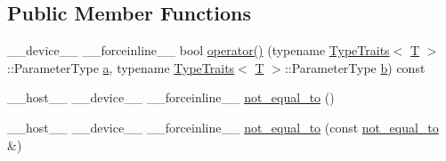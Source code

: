 \subsection*{Public Member Functions}
\begin{DoxyCompactItemize}
\item 
\-\_\-\-\_\-device\-\_\-\-\_\- \-\_\-\-\_\-forceinline\-\_\-\-\_\- bool \hyperlink{structcv_1_1gpu_1_1device_1_1not__equal__to_a1b8df5defd11d35f5769bcd4d0babe44}{operator()} (typename \hyperlink{structcv_1_1gpu_1_1device_1_1TypeTraits}{Type\-Traits}$<$ \hyperlink{calib3d_8hpp_a3efb9551a871ddd0463079a808916717}{T} $>$\-::Parameter\-Type \hyperlink{legacy_8hpp_a1031d0e0a97a340abfe0a6ab9e831045}{a}, typename \hyperlink{structcv_1_1gpu_1_1device_1_1TypeTraits}{Type\-Traits}$<$ \hyperlink{calib3d_8hpp_a3efb9551a871ddd0463079a808916717}{T} $>$\-::Parameter\-Type \hyperlink{legacy_8hpp_ac04272e8ca865b8fba18d36edae9fd2a}{b}) const 
\item 
\-\_\-\-\_\-host\-\_\-\-\_\- \-\_\-\-\_\-device\-\_\-\-\_\- \-\_\-\-\_\-forceinline\-\_\-\-\_\- \hyperlink{structcv_1_1gpu_1_1device_1_1not__equal__to_a4ace531528727b714f7465341e8ab78e}{not\-\_\-equal\-\_\-to} ()
\item 
\-\_\-\-\_\-host\-\_\-\-\_\- \-\_\-\-\_\-device\-\_\-\-\_\- \-\_\-\-\_\-forceinline\-\_\-\-\_\- \hyperlink{structcv_1_1gpu_1_1device_1_1not__equal__to_a74380f588a9f469997202aca0e533d70}{not\-\_\-equal\-\_\-to} (const \hyperlink{structcv_1_1gpu_1_1device_1_1not__equal__to}{not\-\_\-equal\-\_\-to} \&)
\end{DoxyCompactItemize}



